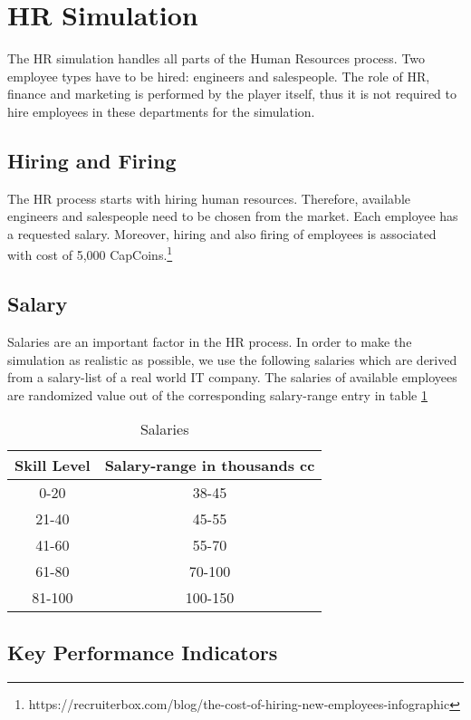 \section{HR Simulation}
\label{sec:HRsim}
The HR simulation handles all parts of the Human Resources process. Two employee types have to be hired: engineers and salespeople. The role of HR, finance and marketing is performed by the player itself, thus it is not required to hire employees in these departments for the simulation. 

\subsection{Hiring and Firing}
The HR process starts with hiring human resources. Therefore, available engineers and salespeople need to be chosen from the market. Each employee has a requested salary. Moreover, hiring and also firing of employees is associated with cost of 5,000 CapCoins.\footnote{https://recruiterbox.com/blog/the-cost-of-hiring-new-employees-infographic}

\subsection{Salary}
Salaries are an important factor in the HR process. In order to make the simulation as realistic as possible, we use the following salaries which are derived from a salary-list of a real world IT company. The salaries of available employees are randomized value out of the corresponding salary-range entry in table \ref{tab:Salaries}

\begin{table}[ht]
    \centering
\begin{tabular}{c|c}
    \hline
     \textbf{Skill Level} & \textbf{Salary-range in thousands cc} \\
     \hline \hline
     0-20 & 38-45  \\
     21-40 & 45-55 \\
     41-60 & 55-70  \\
     61-80 & 70-100  \\
     81-100 & 100-150  \\
     \hline

\end{tabular}
\caption{Salaries}
    \label{tab:Salaries}
\end{table}

\subsection{Key Performance Indicators}
\label{sub:KPI}

